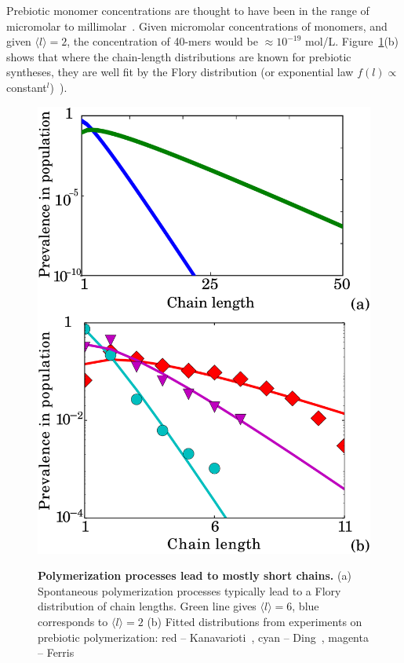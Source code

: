 \documentclass[twocolumn,letterpaper]{revtex4}
\begin{document}
 Prebiotic monomer concentrations are thought to have been in the range of micromolar to 
millimolar~\cite{Stribling1987,Huber1998,Aubrey2009,Kanavarioti2001,Lazcano1996}.  Given micromolar 
concentrations of monomers, and given $\langle l \rangle = 2$, the concentration of 40-mers would 
be $\approx 10^{-19} $ mol/L.  Figure~\ref{fig:flory}(b) shows that where the chain-length 
distributions are known for prebiotic syntheses, they are well fit by the Flory 
distribution (or exponential law $f(l)\propto$ 
constant$^l$)~\cite{nowak2008prevolutionary,Derr2012}).


\begin{figure}[ht!]
  \centering
  \includegraphics[width=0.9\columnwidth]{pictures/flory-two.pdf} \\
  \caption{\textbf{Polymerization processes lead to mostly short chains.} (a)  Spontaneous 
polymerization processes typically lead to a Flory distribution of chain lengths. 
Green line gives $\langle  l \rangle= 6$, blue corresponds to $\langle l \rangle=2$
(b) Fitted distributions from experiments on prebiotic polymerization: red -- 
Kanavarioti~\cite{Kanavarioti2001}, cyan -- Ding~\cite{Ding1996}, 
magenta -- Ferris~\cite{Ferris1999}}
  \label{fig:flory}
\end{figure}
\end{document}
